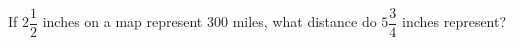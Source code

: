 If $2\dfrac{1}{2}$ inches on a map represent $300$ miles, what distance do $5\dfrac{3}{4}$ inches represent?
